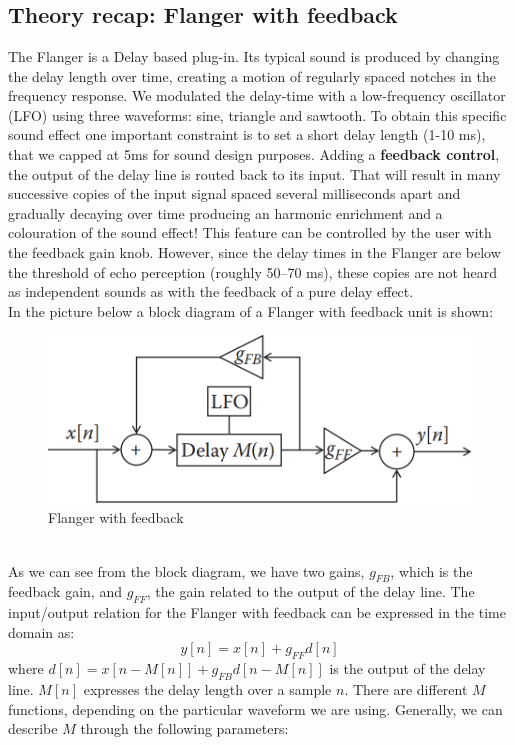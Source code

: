 \documentclass[a4paper,12pt]{report}
\begin{document}
\chapter{}
\section{Theory recap: Flanger with feedback}
The Flanger is a Delay based plug-in. Its typical sound is produced by changing the delay length over time, creating a motion of regularly spaced notches in the frequency response. We modulated the delay-time with a low-frequency oscillator (LFO) using three waveforms: sine, triangle and sawtooth. To obtain this specific sound effect one important constraint is to set a short delay length (1-10 ms), that we capped at 5ms for sound design purposes. Adding a \textbf{feedback control}, the output of the delay line is routed back to its input. That will result in many successive copies of the input signal spaced several milliseconds apart and gradually decaying over time producing an harmonic enrichment and a colouration of the sound effect! This feature can be controlled by the user with the feedback gain knob. However, since the delay times in the Flanger are below the threshold of echo perception (roughly 50–70 ms), these copies are not heard as independent sounds as with the feedback of a pure delay effect.
\\In the picture below a block diagram of a Flanger with feedback unit is shown:
\begin{figure}[h]
\centering
\includegraphics[scale=.45]{db_flanger.png}
\caption{Flanger with feedback}
\end{figure}
\\As we can see from the block diagram, we have two gains, $\textit{g}_{FB}$, which is the feedback gain, and $\textit{g}_{FF}$, the gain related to the output of the delay line. The input/output relation for the Flanger with feedback can be expressed in the time domain as:
\[ y[n] = x[n]+ g_{FF}d[n]\] where $d[n]=x[n-M[n]]+g_{FB}d[n-M[n]] $ is the output of the delay line. $M[n]$ expresses the delay length over a sample $n$. There are different $M$ functions, depending on the particular waveform we are using. Generally, we can describe $M$ through the following parameters: 
\end{document}
